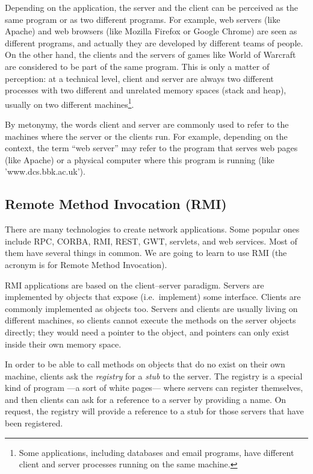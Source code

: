 Depending on the application, the server and the client can be
perceived as the same program or as two different programs. 
For example, web servers (like
Apache) and web browsers (like Mozilla Firefox or Google Chrome) are
seen as different programs, and actually they are developed by
different teams of people. On the other hand, the clients and the
servers of games like World of Warcraft are considered to be part of
the same program. This is only a matter of perception: at a technical
level, client and server are always two different processes with two
different and unrelated memory spaces (stack and heap), usually on two
different machines\footnote{Some applications, including databases and
email programs, have different client and server processes running on
the same machine.}. 

By metonymy, the words client and server are commonly used to refer to
the machines where the server or the clients run. For example,
depending on the context, the term ``web server'' may refer to the
program that serves web pages (like Apache) or a physical computer
where this program is running (like 'www.dcs.bbk.ac.uk'). 

\subsection{Remote Method Invocation (RMI)}
\label{sec:remote-meth-invoc}

There are many technologies to create network applications. Some 
popular ones include RPC, CORBA, RMI, REST, GWT, servlets, and web
services. Most of them have several things in common. We are going to
learn to use RMI (the acronym is for Remote Method Invocation). 

RMI applications are based on the client--server paradigm. Servers are
implemented by objects that expose (i.e.~implement) some
interface. Clients are commonly implemented as objects too. Servers
and clients are usually living on different machines, so clients
cannot execute the methods on the server objects directly; they would
need a pointer to the object, and pointers can only exist inside their
own memory space. 

In order to be able to call methods on objects that do no exist on
their own machine, clients ask the \emph{registry} for a \emph{stub} to the
server. The registry is a special kind of program ---a sort of white
pages--- where servers can register themselves, and then clients can
ask for a reference to a server by providing a name. 
On request, the registry will
provide a reference to a stub for those servers that have been registered. 

